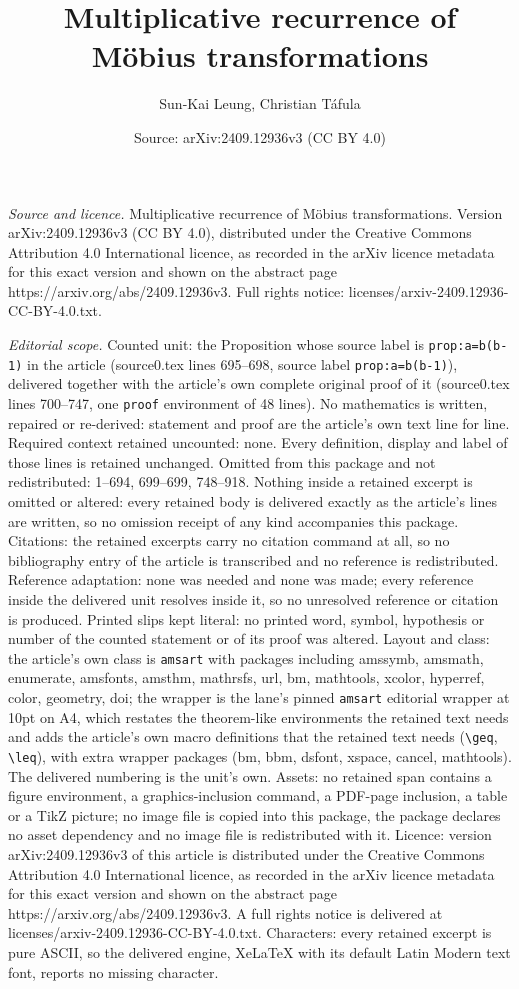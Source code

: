 \documentclass[10pt,a4paper]{amsart}
\title[Multiplicative recurrence of M\"obius transformations]{Multiplicative recurrence of M\"obius transformations}
\author{Sun-Kai Leung, Christian T\'afula}
\date{Source: arXiv:2409.12936v3 (CC BY 4.0)}
\begin{document}
\maketitle

\noindent\emph{Source and licence.} Multiplicative recurrence of M\"obius transformations. Version arXiv:2409.12936v3 (CC BY 4.0), distributed under the Creative Commons Attribution 4.0 International licence, as recorded in the arXiv licence metadata for this exact version and shown on the abstract page https://arxiv.org/abs/2409.12936v3. Full rights notice: licenses/arxiv-2409.12936-CC-BY-4.0.txt.\par\smallskip

\noindent\textit{Editorial scope.} Counted unit: the Proposition whose source label is \texttt{prop:a=b(b-1)} in the article (source0.tex lines 695--698, source label \texttt{prop:a=b(b-1)}), delivered together with the article's own complete original proof of it (source0.tex lines 700--747, one \texttt{proof} environment of 48 lines). No mathematics is written, repaired or re-derived: statement and proof are the article's own text line for line. Required context retained uncounted: none. Every definition, display and label of those lines is retained unchanged. Omitted from this package and not redistributed: 1--694, 699--699, 748--918. Nothing inside a retained excerpt is omitted or altered: every retained body is delivered exactly as the article's lines are written, so no omission receipt of any kind accompanies this package. Citations: the retained excerpts carry no citation command at all, so no bibliography entry of the article is transcribed and no reference is redistributed. Reference adaptation: none was needed and none was made; every reference inside the delivered unit resolves inside it, so no unresolved reference or citation is produced. Printed slips kept literal: no printed word, symbol, hypothesis or number of the counted statement or of its proof was altered. Layout and class: the article's own class is \texttt{amsart} with packages including amssymb, amsmath, enumerate, amsfonts, amsthm, mathrsfs, url, bm, mathtools, xcolor, hyperref, color, geometry, doi; the wrapper is the lane's pinned \texttt{amsart} editorial wrapper at 10pt on A4, which restates the theorem-like environments the retained text needs and adds the article's own macro definitions that the retained text needs (\texttt{\textbackslash geq}, \texttt{\textbackslash leq}), with extra wrapper packages (bm, bbm, dsfont, xspace, cancel, mathtools). The delivered numbering is the unit's own. Assets: no retained span contains a figure environment, a graphics-inclusion command, a PDF-page inclusion, a table or a TikZ picture; no image file is copied into this package, the package declares no asset dependency and no image file is redistributed with it. Licence: version arXiv:2409.12936v3 of this article is distributed under the Creative Commons Attribution 4.0 International licence, as recorded in the arXiv licence metadata for this exact version and shown on the abstract page https://arxiv.org/abs/2409.12936v3. A full rights notice is delivered at licenses/arxiv-2409.12936-CC-BY-4.0.txt. Characters: every retained excerpt is pure ASCII, so the delivered engine, XeLaTeX with its default Latin Modern text font, reports no missing character.
\end{document}
